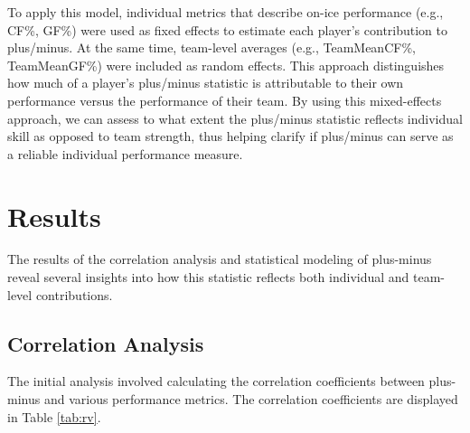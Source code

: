 \documentclass[12pt]{article}
\begin{document}
To apply this model, individual metrics that describe on-ice performance (e.g., CF\%, GF\%) were used as fixed effects to estimate each player’s 
contribution to plus/minus. At the same time, team-level averages (e.g., TeamMeanCF\%, TeamMeanGF\%) were included as random effects. This 
approach distinguishes how much of a player's plus/minus statistic is attributable to their own performance versus the performance of their team.
By using this mixed-effects approach, we can assess to what extent the plus/minus statistic reflects individual skill as opposed to team 
strength, thus helping clarify if plus/minus can serve as a reliable individual performance measure. 


\section{Results}
\label{sec:resu}

The results of the correlation analysis and statistical modeling of plus-minus reveal several insights into how this statistic reflects 
both individual and team-level contributions.

\subsection{Correlation Analysis}

The initial analysis involved calculating the correlation coefficients between plus-minus and various performance metrics. The correlation 
coefficients are displayed in Table \ref{tab:rv}.
\end{document}
